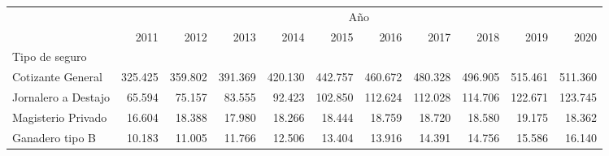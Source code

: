 \begin{tabular}{lllllllllll}
\cline{1-11}
\multicolumn{1}{c}{} &
  \multicolumn{10}{|c}{Año} \\
\multicolumn{1}{c}{} &
  \multicolumn{1}{|r}{2011} &
  \multicolumn{1}{r}{2012} &
  \multicolumn{1}{r}{2013} &
  \multicolumn{1}{r}{2014} &
  \multicolumn{1}{r}{2015} &
  \multicolumn{1}{r}{2016} &
  \multicolumn{1}{r}{2017} &
  \multicolumn{1}{r}{2018} &
  \multicolumn{1}{r}{2019} &
  \multicolumn{1}{r}{2020} \\
\cline{1-11}
\multicolumn{1}{l}{Tipo de seguro} &
  \multicolumn{1}{|r}{} &
  \multicolumn{1}{r}{} &
  \multicolumn{1}{r}{} &
  \multicolumn{1}{r}{} &
  \multicolumn{1}{r}{} &
  \multicolumn{1}{r}{} &
  \multicolumn{1}{r}{} &
  \multicolumn{1}{r}{} &
  \multicolumn{1}{r}{} &
  \multicolumn{1}{r}{} \\
\multicolumn{1}{l}{\hspace{1em}Cotizante General} &
  \multicolumn{1}{|r}{325.425} &
  \multicolumn{1}{r}{359.802} &
  \multicolumn{1}{r}{391.369} &
  \multicolumn{1}{r}{420.130} &
  \multicolumn{1}{r}{442.757} &
  \multicolumn{1}{r}{460.672} &
  \multicolumn{1}{r}{480.328} &
  \multicolumn{1}{r}{496.905} &
  \multicolumn{1}{r}{515.461} &
  \multicolumn{1}{r}{511.360} \\
\multicolumn{1}{l}{\hspace{1em}Jornalero a Destajo} &
  \multicolumn{1}{|r}{65.594} &
  \multicolumn{1}{r}{75.157} &
  \multicolumn{1}{r}{83.555} &
  \multicolumn{1}{r}{92.423} &
  \multicolumn{1}{r}{102.850} &
  \multicolumn{1}{r}{112.624} &
  \multicolumn{1}{r}{112.028} &
  \multicolumn{1}{r}{114.706} &
  \multicolumn{1}{r}{122.671} &
  \multicolumn{1}{r}{123.745} \\
\multicolumn{1}{l}{\hspace{1em}Magisterio Privado} &
  \multicolumn{1}{|r}{16.604} &
  \multicolumn{1}{r}{18.388} &
  \multicolumn{1}{r}{17.980} &
  \multicolumn{1}{r}{18.266} &
  \multicolumn{1}{r}{18.444} &
  \multicolumn{1}{r}{18.759} &
  \multicolumn{1}{r}{18.720} &
  \multicolumn{1}{r}{18.580} &
  \multicolumn{1}{r}{19.175} &
  \multicolumn{1}{r}{18.362} \\
\multicolumn{1}{l}{\hspace{1em}Ganadero tipo B} &
  \multicolumn{1}{|r}{10.183} &
  \multicolumn{1}{r}{11.005} &
  \multicolumn{1}{r}{11.766} &
  \multicolumn{1}{r}{12.506} &
  \multicolumn{1}{r}{13.404} &
  \multicolumn{1}{r}{13.916} &
  \multicolumn{1}{r}{14.391} &
  \multicolumn{1}{r}{14.756} &
  \multicolumn{1}{r}{15.586} &
  \multicolumn{1}{r}{16.140} \\

\end{tabular}
